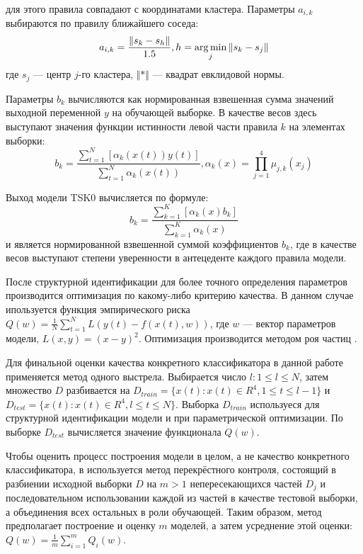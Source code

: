 для этого правила совпадают с координатами кластера. Параметры \(a_{i,k}\) выбираются
по правилу ближайшего соседа:
\begin{displaymath}
a_{i,k}=\frac{\Vert s_k-s_h\Vert}{1.5},h=\operatorname*{arg\,min}_{j}\Vert s_k-s_j\Vert
\end{displaymath}
где \(s_j\) --- центр \(j\)-го кластера, \(\Vert * \Vert\) --- квадрат евклидовой нормы.
\par
Параметры \(b_k\) вычисляются как нормированная взвешенная сумма значений выходной переменной \(y\)
на обучающей выборке. В качестве весов здесь выступают значения функции истинности левой части
правила \(k\) на элементах выборки:
\begin{displaymath}
  b_k=\frac{\sum_{t=1}^{N}[\alpha_k(x(t))y(t)]}{\sum_{t=1}^{N}\alpha_k(x(t))},
  \alpha_k(x)=\prod_{j=1}^{4}\mu_{j,k}(x_j)
\end{displaymath}
\par
Выход модели TSK0 вычисляется по формуле:
\begin{displaymath}
  b_k=\frac{\sum_{k=1}^{K}[\alpha_k(x)b_k]}{\sum_{k=1}^{K}\alpha_k(x)}
\end{displaymath}
и является нормированной взвешенной суммой коэффициентов \(b_k\), где в
качестве весов выступают степени уверенности в антецеденте каждого правила модели.
\par
После структурной идентификации для более точного определения параметров
производится оптимизация по какому-либо критерию качества. В данном
случае ипользуется функция эмпирического риска \(Q(w)=\frac{1}{N}\sum_{t=1}^{N}L(y(t)-f(x(t),w))\),
где \(w\) --- вектор параметров модели, \(L(x,y)=(x-y)^2\). Оптимизация производится
методом роя частиц \cite{pso}.
\par
Для финальной оценки качества конкретного классификатора в данной работе применяется
метод одного выстрела. Выбирается число \(l:1\leqslant l\leqslant N\),
затем множество \(D\) разбивается на \(D_{train} = \{x(t):x(t)\in R^4, 1 \leqslant t \leqslant l-1\}\)
и \(D_{test} = \{x(t):x(t)\in R^4, l \leqslant t \leqslant N\}\). Выборка \(D_{train}\)
используеся для структурной идентификации модели и при параметрической оптимизации.
По выборке \(D_{test}\) вычисляется значение функционала \(Q(w)\).
\par
Чтобы оценить процесс построения модели в целом, а не качество конкретного классификатора,
в используется метод перекрёстного контроля, состоящий в разбиении исходной выборки
\(D\) на \(m>1\) непересекающихся частей \(D_j\) и последовательном использовании
каждой из частей в качестве тестовой выборки, а объединения всех остальных в роли
обучающей. Таким образом, метод предполагает построение и оценку \(m\) моделей, а
затем усреднение этой оценки: \(Q(w)=\frac{1}{m} \sum_{i=1}^{m}Q_i(w)\).
